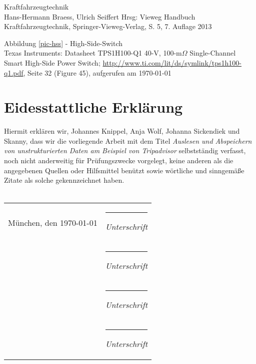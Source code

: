 \documentclass[a4paper,oneside,12pt]{report}
\begin{document}
	
	
	\clearpage
	\begin{thebibliography}{9} 
		\vspace{1.0cm}
		
		 Kraftfahrzeugtechnik \\ Hans-Hermann Braess, Ulrich Seiffert Hrsg: \glqq Vieweg Handbuch Kraftfahrzeugtechnik\grqq, Springer-Vieweg-Verlag, S. 5, 7. Auflage 2013
			
		 Abbildung \ref{pic-hss} - High-Side-Switch\\ Texas Instruments: Datasheet TPS1H100-Q1 40-V, 100-m$\Omega$ Single-Channel Smart High-Side Power Switch; \newline \url{http://www.ti.com/lit/ds/symlink/tps1h100-q1.pdf}, Seite 32 (Figure 45), aufgerufen am \today	
	\end{thebibliography}
	
	
	
	\newpage
	\chapter*{Eidesstattliche Erklärung}
		Hiermit erklären wir, Johannes Knippel, Anja Wolf, Johanna Sickendiek und Skanny, dass wir die vorliegende Arbeit mit dem Titel \textit{Auslesen und Abspeichern von unstrukturierten Daten am Beispiel von Tripadvisor} selbstständig verfasst, noch nicht anderweitig für Prüfungszwecke vorgelegt, keine anderen als die angegebenen Quellen oder Hilfsmittel benützt sowie wörtliche und sinngemäße Zitate als solche gekennzeichnet haben.
		\vspace{15mm}
		\\
		\\
		\begin{flushleft}
			\begin{tabular}[H]{ll}
				
				München, den \parbox{5,5cm}{\today}  	& 	\parbox{6cm}{\hrule\medskip \textit{Unterschrift}}\\[2cm]
													  	& 	\parbox{6cm}{\hrule\medskip \textit{Unterschrift}}\\[2cm]
													  	& 	\parbox{6cm}{\hrule\medskip \textit{Unterschrift}}\\[2cm]
													  	& 	\parbox{6cm}{\hrule\medskip \textit{Unterschrift}}\\[2cm]
			\end{tabular}
		\end{flushleft}
\end{document}
